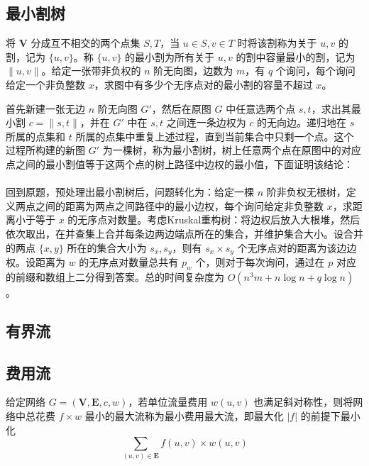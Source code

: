 \documentclass[12pt,a4paper]{article}
\begin{document}
\newpage
\subsection{最小割树}
\begin{mdframed}[leftline=true, linewidth=2pt, linecolor=gray]
	将 $\mathbf{V}$ 分成互不相交的两个点集 $S,T$，当 $u\in S,v\in T$ 时将该割称为关于 $u,v$ 的割，记为 $\{u,v\}$。称 $\{u,v\}$ 的最小割为所有关于 $u,v$ 的割中容量最小的割，记为 $\|u,v\|$。给定一张带非负权的 $n$ 阶无向图，边数为 $m$，有 $q$ 个询问，每个询问给定一个非负整数 $x$，求图中有多少个无序点对的最小割的容量不超过 $x$。
\end{mdframed}
首先新建一张无边 $n$ 阶无向图 $G'$，然后在原图 $G$ 中任意选两个点 $s,t$，求出其最小割 $c=\|s,t\|$，并在 $G'$ 中在 $s,t$ 之间连一条边权为 $c$ 的无向边。递归地在 $s$ 所属的点集和 $t$ 所属的点集中重复上述过程，直到当前集合中只剩一个点。这个过程所构建的新图 $G'$ 为一棵树，称为最小割树，树上任意两个点在原图中的对应点之间的最小割值等于这两个点的树上路径中边权的最小值，下面证明该结论：\\
\\
回到原题，预处理出最小割树后，问题转化为：给定一棵 $n$ 阶非负权无根树，定义两点之间的距离为两点之间路径中的最小边权，每个询问给定非负整数 $x$，求距离小于等于 $x$ 的无序点对数量。考虑Kruskal重构树：将边权后放入大根堆，然后依次取出，在并查集上合并每条边两边端点所在的集合，并维护集合大小。设合并的两点 $\{x,y\}$ 所在的集合大小为 $s_x,s_y$，则有 $s_x\times s_y$ 个无序点对的距离为该边边权。设距离为 $w$ 的无序点对数量总共有 $p_w$ 个，则对于每次询问，通过在 $p$ 对应的前缀和数组上二分得到答案。总的时间复杂度为 $O(n^3m+n\log{n}+q\log{n})$。

\subsection{有界流} %

\subsection{费用流}
\begin{mdframed}[leftline=true, linewidth=2pt, linecolor=gray]
	给定网络 $G=(\mathbf{V},\mathbf{E},c,w)$，若单位流量费用 $w(u,v)$ 也满足斜对称性，则将网络中总花费 $f\times w$ 最小的最大流称为最小费用最大流，即最大化 $|f|$ 的前提下最小化 
	\begin{equation*}
		\sum_{(u,v)\in\mathbf{E}}f(u,v)\times w(u,v)
	\end{equation*}
\end{mdframed}
\end{document}

